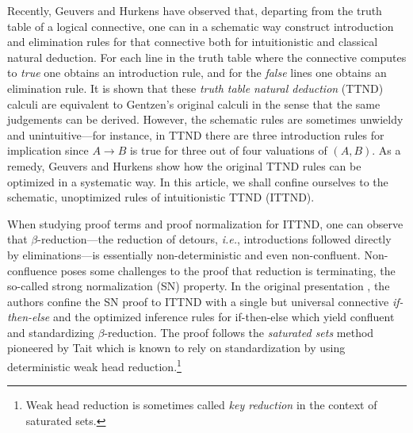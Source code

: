 \documentclass[a4paper,USenglish,cleveref, autoref, thm-restate]{lipics-v2019}
\newcommand{\ie}{\emph{i.e.}\xspace}
\begin{document}
Recently, Geuvers and Hurkens \cite{geuversHurkens:icla17} have
observed that, departing from the truth table of a logical connective,
one can in a schematic way construct introduction and elimination
rules for that connective both for intuitionistic and classical
natural deduction.  For each line in the truth table where the
connective computes to \emph{true} one obtains an introduction rule,
and for the \emph{false} lines one obtains an elimination rule.
It is shown that these \emph{truth table natural deduction} (TTND)
calculi are equivalent to Gentzen's original calculi
\cite{gentzen:natuerlichesSchliessen}
in the sense that the
same judgements can be derived.  However, the schematic rules are
sometimes unwieldy and unintuitive---for instance, in TTND there are three
introduction rules for implication since $A \to B$ is true for three
out of four valuations of $(A,B)$.  As a remedy, Geuvers and Hurkens
show how the original TTND rules can be optimized in a systematic
way.  In this article, we shall confine ourselves to the schematic,
unoptimized rules of intuitionistic TTND (ITTND).

When studying proof terms and proof normalization for ITTND, one can
observe that $\beta$-reduction---the reduction of detours, \ie, introductions followed
directly by eliminations\footnotemark---is essentially non-deterministic and even
non-confluent.
%
Non-confluence poses some challenges to the proof that reduction is
terminating, the so-called strong normalization (SN) property.  In the
original presentation \cite{geuversHurkens:icla17}, the authors
confine the SN proof to ITTND with a single but universal
connective \emph{if-then-else} and the optimized inference rules for
if-then-else which yield confluent and standardizing $\beta$-reduction.  The proof
follows the \emph{saturated sets} method pioneered by Tait
\cite{tait:functionalsFiniteTypeI} which is known to rely on
standardization by using deterministic weak head
reduction.\footnote{Weak head reduction is sometimes called \emph{key
  reduction} in the context of saturated sets.}
\end{document}
